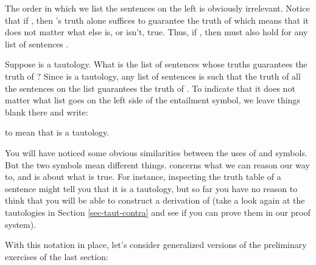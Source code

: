 \begin{center}
\end{center}

The order in which we list the sentences on the left is obviously irrelevant.
Notice that if , then 's truth alone suffices to guarantee 
the truth of  which means that it does not matter what else is, or isn't, 
true.  Thus, if , then  must also hold 
for any list of sentences \p{\Gamma}. 

Suppose  is a tautology. What is the list of sentences whose truths 
guarantees the truth of ? Since  is a tautology, any list of sentences 
is such that the truth of all the sentences on the list guarantees the truth of 
. To indicate that it does not matter what list goes on the left side of 
the entailment symbol, we leave things blank there and write:

\begin{center}
\end{center}

to mean that  is a tautology.

You will have noticed some obvious similarities between the uses of \p{\lproves} 
and \p{\lentails} symbols. But the two symbols mean different things.  
\p{\lproves} concerns what we can reason our way to, and \p{\lentails} is about 
what is true. For instance, inspecting the truth table of a sentence  might 
tell you that it is a tautology, but so far you have no reason to think that you 
will be able to construct a  derivation of  (take a look again at 
the tautologies in Section \ref{sec-taut-contra} and see if you can prove them 
in our proof system).

With this notation in place, let's consider generalized versions of the 
preliminary exercises of the last section:



